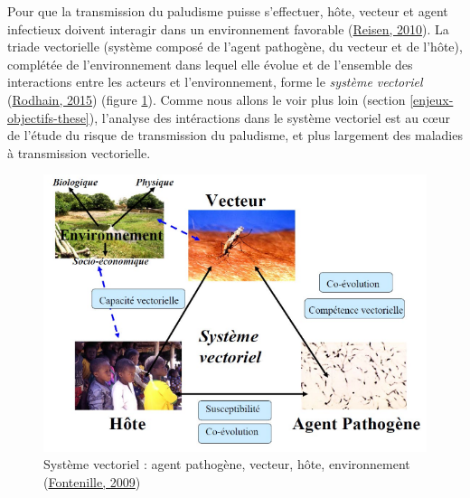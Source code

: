 \documentclass[12pt,twoside]{reedthesis}
\begin{document}
Pour que la transmission du paludisme puisse s'effectuer, hôte, vecteur et agent infectieux doivent interagir dans un environnement favorable (\protect\hyperlink{ref-reisen_landscape_2010}{Reisen, 2010}). La triade vectorielle (système composé de l'agent pathogène, du vecteur et de l'hôte), complétée de l'environnement dans lequel elle évolue et de l'ensemble des interactions entre les acteurs et l'environnement, forme le \emph{système vectoriel} (\protect\hyperlink{ref-rodhain_microbe_2015}{Rodhain, 2015}) (figure \ref{fig:systeme-vectoriel}). Comme nous allons le voir plus loin (section \ref{enjeux-objectifs-these}), l'analyse des intéractions dans le système vectoriel est au cœur de l'étude du risque de transmission du paludisme, et plus largement des maladies à transmission vectorielle.
\begin{figure}

{\centering \includegraphics[width=0.7\linewidth]{figure/systeme_vectoriel} 

}

\caption[Le sytème vectoriel]{Système vectoriel : agent pathogène, vecteur, hôte, environnement (\protect\hyperlink{ref-fontenille_2019}{Fontenille, 2009})}\label{fig:systeme-vectoriel}
\end{figure}
\end{document}
